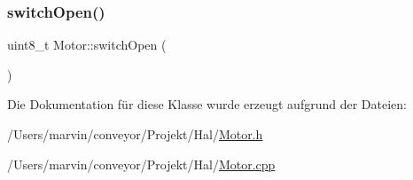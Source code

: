 \hypertarget{class_motor_a35c0d7c6350b9f670dc243d31ea40263}{}\label{class_motor_a35c0d7c6350b9f670dc243d31ea40263} 
\subsubsection{\texorpdfstring{switch\+Open()}{switchOpen()}}
{\footnotesize\ttfamily uint8\+\_\+t Motor\+::switch\+Open (\begin{DoxyParamCaption}{ }\end{DoxyParamCaption})}



Die Dokumentation für diese Klasse wurde erzeugt aufgrund der Dateien\+:\begin{DoxyCompactItemize}
\item 
/\+Users/marvin/conveyor/\+Projekt/\+Hal/\hyperlink{_motor_8h}{Motor.\+h}\item 
/\+Users/marvin/conveyor/\+Projekt/\+Hal/\hyperlink{_motor_8cpp}{Motor.\+cpp}\end{DoxyCompactItemize}
